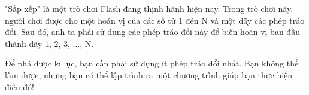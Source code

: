 "Sắp xếp" là một trò chơi Flash đang thịnh hành hiện nay. Trong trò chơi này, người chơi được cho một hoán vị của các số từ 1 đén N và một dãy các phép tráo đổi. Sau đó, anh ta phải sử dụng các phép tráo đổi này để biến hoán vị ban đầu thành dãy 1, 2, 3, ..., N.  

   Để phá được kỉ lục, bạn cần phải sử dụng ít phép tráo đổi nhất. Bạn không thể làm được, nhưng bạn có thể lập trình ra một chương trình giúp bạn thực hiện điều đó!
